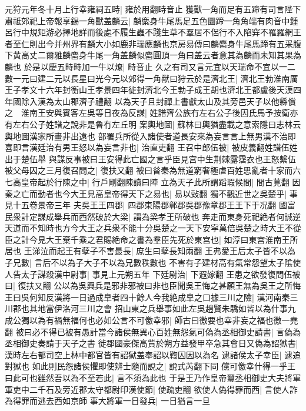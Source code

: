 元狩元年冬十月上行幸雍祠五畤|{
	雍於用翻畤音止}
獲獸一角而足有五蹄有司言陛下肅祗郊祀上帝報享錫一角獸盖麟云|{
	麟麋身牛尾馬足五色圜蹄一角角端有肉音中鍾呂行中規矩游必擇地詳而後處不履生蟲不踐生草不羣居不侶行不入陷穽不罹羅網王者至仁則出今并州界有麟大小如鹿非瑞應麟也京房易傳曰麟麕身牛尾馬蹄有五采腹下黄高丈二爾雅麟麕身牛尾一角盖麟似麕圓頂一角曰盖云者意其為麟而未知其果為麟也}
於是以慶五畤畤加一牛以燎|{
	畤音止}
久之有司又言元宜以天瑞命不宜以一二數一元曰建二元以長星曰光今元以郊得一角獸曰狩云於是濟北王|{
	濟北王勃淮南厲王子孝文十六年封衡山王孝景四年徙封濟北今王勃子成王胡也濟北王都盧後天漢四年國除入漢為太山郡濟子禮翻}
以為天子且封禪上書獻太山及其旁邑天子以他縣償之　淮南王安與賓客左吳等日夜為反謀|{
	姓譜齊公族冇左右公子後因氏馬予按衛亦有左右公子姓譜之說非是魯冇左丘明}
案輿地圖|{
	蘇林曰輿猶盡載之意索隱曰志林云輿地圖漢家所畫非出遠也}
部署兵所從入諸使者道長安來為妄言言上無男漢不治即喜即言漢廷治有男王怒以為妄言非也|{
	治直吏翻}
王召中郎伍被|{
	被皮義翻姓譜伍姓出于楚伍舉}
與謀反事被曰王安得此亡國之言乎臣見宫中生荆棘露霑衣也王怒繫伍被父母囚之三月復召問之|{
	復扶又翻}
被曰㫺秦為無道窮奢極虐百姓思亂者十家而六七高皇帝起於行陳之中|{
	行戶剛翻陳讀曰陣}
立為天子此所謂蹈瑕候間|{
	間古莧翻}
因秦之亡而動者也今大王見高皇帝得天下之易也|{
	易以䜴翻}
獨不觀近世之吳楚乎|{
	事見十五卷景帝三年}
夫吳王王四郡|{
	四郡束陽郡鄣郡吳郡豫章郡王王下于况翻}
國富民衆計定謀成舉兵而西然破於大梁|{
	謂為梁孝王所破也}
奔走而東身死祀絶者何誠逆天道而不知時也方今大王之兵衆不能十分吳楚之一天下安寜萬倍吳楚之時大王不從臣之計今見大王棄千乘之君賜絶命之書為羣臣先死於東宫也|{
	如淳曰東宫淮南王所居也}
王涕泣而起王有孽子不害最長|{
	庶生曰孽長知兩翻}
王弗愛王后太子皆不以為子兄數|{
	言后不以為子大子不以為兄數秩數也}
不害有子建材高有氣常怨望太子隂使人告太子謀殺漢中尉事|{
	事見上元朔五年}
下廷尉治|{
	下遐嫁翻}
王患之欲發復問伍被曰|{
	復扶又翻}
公以為吳興兵是邪非邪被曰非也臣聞吳王悔之甚願王無為吳王之所悔王曰吳何知反漢將一日過成臯者四十餘人今我絶成臯之口據三川之險|{
	漢河南秦三川郡也其地當伊洛河三川之會}
招山東之兵舉事如此左吳趙賢朱驕如皆以為什事九成公獨以為有禍無福何也必如公言不可儌幸邪|{
	師古曰徼要也幸非妄之福也徼一堯翻}
被曰必不得已被有愚計當今諸侯無異心百姓無怨氣可偽為丞相御史請書|{
	言偽為丞相御史奏請于天子之書}
徙郡國豪傑高貲於朔方益發甲卒急其會日又偽為詔獄書|{
	漢時左右都司空上林中都官皆有詔獄盖奉詔以鞫囚因以為名}
逮諸侯太子幸臣|{
	逮追對獄也}
如此則民怨諸侯懼即使辨士隨而說之|{
	說式芮翻下同}
儻可儌幸什得一乎王曰此可也雖然吾以為不至若此|{
	言不須為此也}
于是王乃作皇帝璽丞相御史大夫將軍軍吏中二千石及旁近郡太守都尉印漢使節|{
	使疏吏翻}
欲使人偽得罪而西|{
	言使人詐為得罪而逃去西如京師}
事大將軍一日發兵|{
	一日猶言一旦}
